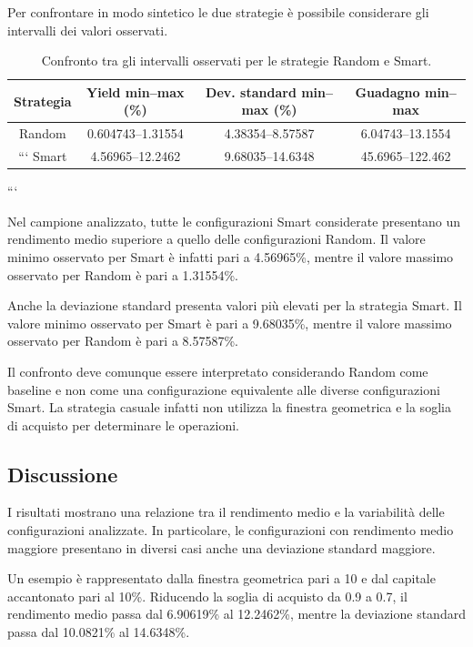 \documentclass[12pt,a4paper,oneside]{report}
\begin{document}
Per confrontare in modo sintetico le due strategie è possibile considerare
gli intervalli dei valori osservati.

\begin{table}[ht]
\centering
\caption{Confronto tra gli intervalli osservati per le strategie Random
e Smart.}
\label{tab:strategy_comparison}
\begin{tabular}{c|c|c|c}
\hline
\textbf{Strategia} &
\textbf{Yield min--max (\%)} &
\textbf{Dev. standard min--max (\%)} &
\textbf{Guadagno min--max} \\
\hline
Random & 0.604743--1.31554 & 4.38354--8.57587 &
6.04743--13.1554 \\

```
    Smart & 4.56965--12.2462 & 9.68035--14.6348 &
    45.6965--122.462 \\
    \hline
\end{tabular}
```

\end{table}

Nel campione analizzato, tutte le configurazioni Smart considerate presentano
un rendimento medio superiore a quello delle configurazioni Random. Il valore
minimo osservato per Smart è infatti pari a 4.56965\%, mentre il valore
massimo osservato per Random è pari a 1.31554\%.

Anche la deviazione standard presenta valori più elevati per la strategia
Smart. Il valore minimo osservato per Smart è pari a 9.68035\%, mentre il
valore massimo osservato per Random è pari a 8.57587\%.

Il confronto deve comunque essere interpretato considerando Random come
baseline e non come una configurazione equivalente alle diverse
configurazioni Smart. La strategia casuale infatti non utilizza la finestra
geometrica e la soglia di acquisto per determinare le operazioni.

\subsection{Discussione}

I risultati mostrano una relazione tra il rendimento medio e la variabilità
delle configurazioni analizzate. In particolare, le configurazioni con
rendimento medio maggiore presentano in diversi casi anche una deviazione
standard maggiore.

Un esempio è rappresentato dalla finestra geometrica pari a 10 e dal
capitale accantonato pari al 10\%. Riducendo la soglia di acquisto da 0.9 a
0.7, il rendimento medio passa dal 6.90619\% al 12.2462\%, mentre la
deviazione standard passa dal 10.0821\% al 14.6348\%.
\end{document}
